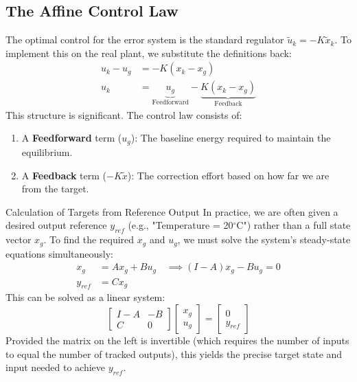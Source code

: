 \subsection{The Affine Control Law}
The optimal control for the error system is the standard regulator $\tilde{u}_k = -K \tilde{x}_k$. To implement this on the real plant, we substitute the definitions back:
\begin{align*}
	u_k - u_g &= -K(x_k - x_g) \nonumber \\
	u_k &= \underbrace{u_g}_{\text{Feedforward}} - \underbrace{K(x_k - x_g)}_{\text{Feedback}}
\end{align*}
This structure is significant. The control law consists of:
\begin{enumerate}
	\item A \textbf{Feedforward} term ($u_g$): The baseline energy required to maintain the equilibrium.
	\item A \textbf{Feedback} term ($-K\tilde{x}$): The correction effort based on how far we are from the target.
\end{enumerate}

\begin{notebox}{Calculation of Targets from Reference Output}
	In practice, we are often given a desired output reference $y_{ref}$ (e.g., "Temperature = 20$^\circ$C") rather than a full state vector $x_g$. To find the required $x_g$ and $u_g$, we must solve the system's steady-state equations simultaneously:
	\begin{align*}
		x_g &= A x_g + B u_g \quad \implies (I - A)x_g - B u_g = 0 \\
		y_{ref} &= C x_g
	\end{align*}
	This can be solved as a linear system:
	\begin{equation}
		\begin{bmatrix} I - A & -B \\ C & 0 \end{bmatrix} 
		\begin{bmatrix} x_g \\ u_g \end{bmatrix} 
		= 
		\begin{bmatrix} 0 \\ y_{ref} \end{bmatrix}
	\end{equation}
	Provided the matrix on the left is invertible (which requires the number of inputs to equal the number of tracked outputs), this yields the precise target state and input needed to achieve $y_{ref}$.
\end{notebox}

